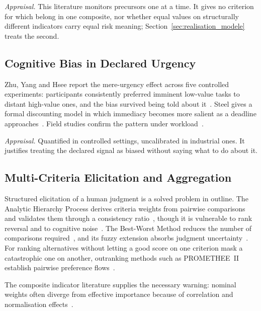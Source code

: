 \emph{Appraisal.} This literature monitors precursors one at a time. It gives no criterion for
which belong in one composite, nor whether equal values on structurally different indicators
carry equal risk meaning; Section~\ref{sec:realisation_modele} treats the second.

\subsection{Cognitive Bias in Declared Urgency}

Zhu, Yang and Hsee report the mere-urgency effect across five controlled experiments:
participants consistently preferred imminent low-value tasks to distant high-value ones, and
the bias survived being told about it~\autocite{zhu2018mere}. Steel gives a formal
discounting model in which immediacy becomes more salient as a deadline
approaches~\autocite{steel2006integrating}. Field studies confirm the pattern under
workload~\autocite{rusou2020psychology,diwa2020task}.

\emph{Appraisal.} Quantified in controlled settings, uncalibrated in industrial ones. It
justifies treating the declared signal as biased without saying what to do about it.

\subsection{Multi-Criteria Elicitation and Aggregation}

Structured elicitation of a human judgment is a solved problem in outline. The Analytic
Hierarchy Process derives criteria weights from pairwise comparisons and validates them
through a consistency ratio~\autocite{saaty1980analytic}, though it is vulnerable to rank
reversal and to cognitive noise~\autocite{dyer1990,triantaphyllou2024}. The Best-Worst Method
reduces the number of comparisons required~\autocite{rezaei2015best}, and its fuzzy extension
absorbs judgment uncertainty~\autocite{guo2017fuzzy,liang2020}. For ranking alternatives
without letting a good score on one criterion mask a catastrophic one on another, outranking
methods such as PROMETHEE~II establish pairwise preference
flows~\autocite{brans1986promethee,behzadian2010promethee}.

The composite indicator literature supplies the necessary warning: nominal weights often
diverge from effective importance because of correlation and normalisation
effects~\autocite{greco2018,becker2017,borgonovo2021global}.

